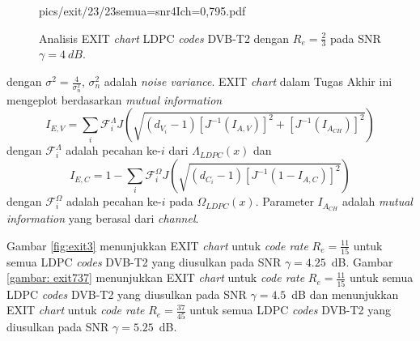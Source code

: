 \begin{figure}[t!]
{pics/exit/23/23semua=snr4Ich=0,795.pdf}
\caption{Analisis EXIT \textit{chart} LDPC \textit{codes} DVB-T2 dengan $R_e=\frac{2}{3}$ pada SNR $\gamma=4~dB$.}
\label{fig:exit49}
\end{figure} 
\noindent dengan $\sigma^2 = \frac{4}{\sigma_n^2}$,  $\sigma_n^2$ adalah \textit{noise variance}.  EXIT \textit{chart} dalam Tugas Akhir ini mengeplot berdasarkan \textit{mutual information}
\begin{equation}
I_{E,V}\! =\! \sum_i \mathcal{F}_i^\Lambda { J\left( \sqrt{(d_{V_i}\!-\!1)[J^{-1}(I_{A,V})]^2\!+\! [J^{-1}(I_{A_{CH}})]^2}\right)}
\label{eq:I_E_V_int}
\end{equation} 
dengan $\mathcal{F}_i^\Lambda$ adalah pecahan ke-$i$ dari $\Lambda_{LDPC}(x)$ dan 
\begin{equation}
I_{E,C} = 1-\sum_i \mathcal{F}_i^\Omega J\left( \sqrt{(d_{C_i}-1)[J^{-1}(1-I_{A,C})]^2}\right)
\end{equation}
dengan $\mathcal{F}_i^\Omega$ adalah pecahan ke-$i$ pada $\Omega_{LDPC}(x)$. Parameter $I_{A_{CH}}$ adalah \textit{mutual information} yang berasal dari \textit{channel}.


Gambar \ref{fig:exit3} menunjukkan EXIT \textit{chart} untuk \textit{code rate} $R_e=\frac{11}{15}$ untuk semua LDPC \textit{codes} DVB-T2 yang diusulkan pada SNR $\gamma=4.25$~dB. Gambar \ref{gambar: exit737} menunjukkan EXIT \textit{chart} untuk \textit{code rate} $R_e=\frac{11}{15}$ untuk semua LDPC \textit{codes} DVB-T2 yang diusulkan pada SNR $\gamma=4.5$~dB dan menunjukkan EXIT \textit{chart} untuk \textit{code rate} $R_e=\frac{37}{45}$ untuk semua LDPC \textit{codes} DVB-T2 yang diusulkan pada SNR $\gamma=5.25$~dB.

